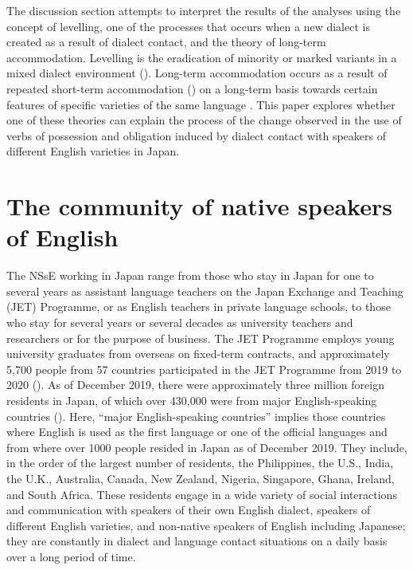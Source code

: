 \documentclass[output=paper,colorlinks,citecolor=brown]{langscibook}
\begin{document}
The discussion section attempts to interpret the results of the analyses using the concept of levelling, one of the processes that occurs when a new dialect is created as a result of dialect contact, and the theory of long-term accommodation. Levelling is the eradication of minority or marked variants in a mixed dialect environment (\cites[149--150]{Britain2018}[98--102]{Trudgill1986}). Long-term accommodation occurs as a result of repeated short-term accommodation (\citealt{Coupland1984, GilesPowesland1975}) on a long-term basis towards certain features of specific varieties of the same language \citep[11--21]{Trudgill1986}. This paper explores whether one of these theories can explain the process of the change observed in the use of verbs of possession and obligation induced by dialect contact with speakers of different English varieties in Japan.

\section{The community of native speakers of English} \label{sec:hirano:2}

The NSsE working in Japan range from those who stay in Japan for one to several years as assistant language teachers on the Japan Exchange and Teaching (JET) Programme, or as English teachers in private language schools, to those who stay for several years or several decades as university teachers and researchers or for the purpose of business. The JET Programme employs young university graduates from overseas on fixed-term contracts, and approximately 5,700 people from 57 countries participated in the JET Programme from 2019 to 2020 (\citealt{CouncilofLocalAuthoritiesforInternationalRelations2021}). As of December 2019, there were approximately three million foreign residents in Japan, of which over 430,000 were from major English\hyp speaking countries (\citealt{eStat2021}). Here, “major English-speaking countries” implies those countries where English is used as the first language or one of the official languages and from where over 1000 people resided in Japan as of December 2019. They include, in the order of the largest number of residents, the Philippines, the U.S., India, the U.K., Australia, Canada, New Zealand, Nigeria, Singapore, Ghana, Ireland, and South Africa. These residents engage in a wide variety of social interactions and communication with speakers of their own English dialect, speakers of different English varieties, and non-native speakers of English including Japanese; they are constantly in dialect and language contact situations on a daily basis over a long period of time.
\end{document}
